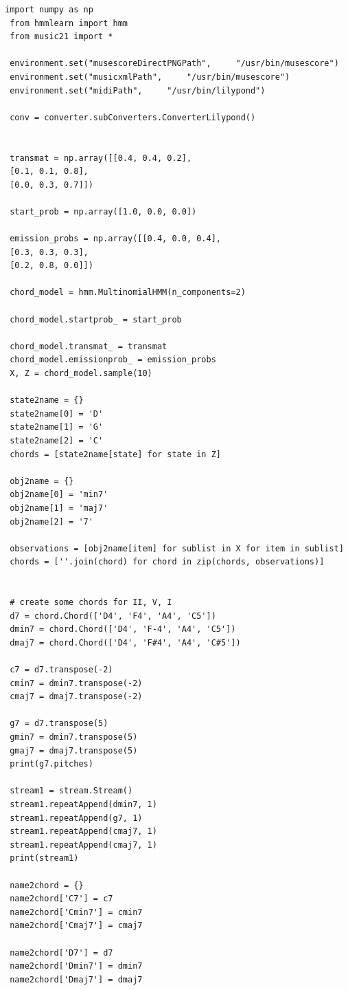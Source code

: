 \begin{przyklad}
	\begin{lstlisting}[caption={Ukryty Model Markowa z użyciem Pythona},captionpos=b]
 import numpy as np
 from hmmlearn import hmm
 from music21 import *
 
 environment.set("musescoreDirectPNGPath",     "/usr/bin/musescore")
 environment.set("musicxmlPath",     "/usr/bin/musescore")
 environment.set("midiPath",     "/usr/bin/lilypond")
 
 conv = converter.subConverters.ConverterLilypond()
 
 
 transmat = np.array([[0.4, 0.4, 0.2],
 [0.1, 0.1, 0.8],
 [0.0, 0.3, 0.7]])
 
 start_prob = np.array([1.0, 0.0, 0.0])
 
 emission_probs = np.array([[0.4, 0.0, 0.4],
 [0.3, 0.3, 0.3],
 [0.2, 0.8, 0.0]])
 
 chord_model = hmm.MultinomialHMM(n_components=2)
 
 chord_model.startprob_ = start_prob
 
 chord_model.transmat_ = transmat
 chord_model.emissionprob_ = emission_probs
 X, Z = chord_model.sample(10)
 
 state2name = {}
 state2name[0] = 'D'
 state2name[1] = 'G'
 state2name[2] = 'C'
 chords = [state2name[state] for state in Z]
 
 obj2name = {}
 obj2name[0] = 'min7'
 obj2name[1] = 'maj7'
 obj2name[2] = '7'
 
 observations = [obj2name[item] for sublist in X for item in sublist]
 chords = [''.join(chord) for chord in zip(chords, observations)]
 
 
 # create some chords for II, V, I
 d7 = chord.Chord(['D4', 'F4', 'A4', 'C5'])
 dmin7 = chord.Chord(['D4', 'F-4', 'A4', 'C5'])
 dmaj7 = chord.Chord(['D4', 'F#4', 'A4', 'C#5'])
 
 c7 = d7.transpose(-2)
 cmin7 = dmin7.transpose(-2)
 cmaj7 = dmaj7.transpose(-2)
 
 g7 = d7.transpose(5)
 gmin7 = dmin7.transpose(5)
 gmaj7 = dmaj7.transpose(5)
 print(g7.pitches)
 
 stream1 = stream.Stream()
 stream1.repeatAppend(dmin7, 1)
 stream1.repeatAppend(g7, 1)
 stream1.repeatAppend(cmaj7, 1)
 stream1.repeatAppend(cmaj7, 1)
 print(stream1)
 
 name2chord = {}
 name2chord['C7'] = c7
 name2chord['Cmin7'] = cmin7
 name2chord['Cmaj7'] = cmaj7
 
 name2chord['D7'] = d7
 name2chord['Dmin7'] = dmin7
 name2chord['Dmaj7'] = dmaj7
 

\end{lstlisting}
\end{przyklad}
